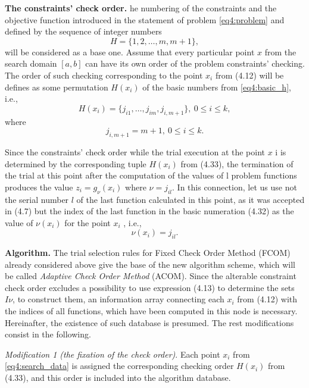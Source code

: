 \documentclass[graybox]{svmult}
\begin{document}
\textbf{The constraints’ check order.} he numbering of the constraints and the objective function introduced in the statement of problem \eqref{eq4:problem} and defined by the sequence of integer numbers
\begin{equation}
  \label{eq4:basic_h}
  H=\{1,2,\dots,m,m+1\},
\end{equation}
will be considered as a base one.
Assume that every particular point $x$ from the search domain $[a,b]$ can have its own order of the problem constraints’ checking. The order of such checking corresponding to the point $x_i$ from (4.12) will be defines as some permutation $H(x_i )$ of the basic numbers from \eqref{eq4:basic_h}, i.e.,
\begin{equation}
  H(x_i)=\{j_{i1},\dots,j_{im},j_{i,m+1}\},\:0\le i\le k,
\end{equation}
where
\begin{equation}
  j_{i,m+1}=m+1,\:0\le i\le k.
\end{equation}

Since the constraints’ check order while the trial execution at the point $x$ i is determined by the corresponding tuple $H(x_i )$ from (4.33), the termination of the trial at this point after the computation of the values of l problem functions produces the value $z_i=g_\nu(x_i)$ where $\nu=j_{il}$. In this connection, let us use not the serial number $l$ of the last function calculated in this point, as it was accepted in (4.7) but the index of the last function in the basic numeration (4.32) as the
value of $\nu(x_i )$ for the point $x_i$ , i.e.,
\begin{equation}
  \nu(x_i)=j_{il}.
\end{equation}

\textbf{Algorithm.} The trial selection rules for Fixed Check Order Method (FCOM) already considered above give the base of the new algorithm scheme, which will be called \emph{Adaptive
Check Order Method} (ACOM). Since the alterable constraint check order excludes a possibility to use expression (4.13) to determine the sets $I\nu$, to construct them, an information array connecting each $x_i$ from (4.12) with the indices of all functions, which have been computed in this node is necessary. Hereinafter, the existence of such database is presumed. The rest modifications consist in the following.

\emph{Modification 1 (the fixation of the check order)}. Each point $x_i$ from \eqref{eq4:search_data} is assigned the corresponding checking order $H(x_i )$ from (4.33), and this order is included into the algorithm database.
\end{document}
